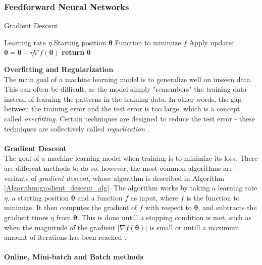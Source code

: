 \documentclass[./main.tex]{subfiles}
\begin{document}
\subsubsection{Feedforward Neural Networks} \label{subsubsec:FeedforwardNN}
\begin{algorithm}[htbp]
    \caption{Gradient Descent \cite{d2l}}
    \label{Algorithm:gradient_descent_alg}
    \begin{algorithmic}[1]
        \Require Learning rate $\eta$
        \Require Starting position $\bm{\theta}$
        \Require Function to minimize $f$
            \State Apply update: $\bm{\theta} = \bm{\theta} - \eta \nabla f(\bm{\theta})$
        \EndWhile
        \State \textbf{return} $\bm{\theta}$
    \end{algorithmic}
\end{algorithm}
\noindent \textbf{Overfitting and Regularization} \\
The main goal of a machine learning model is to generalize well on unseen data. This can often be difficult, as the model simply "remembers" the training data instead of learning the patterns in the training data. In other words, the gap between the training error and the test error is too large, which is a concept called \textit{overfitting}. Certain techniques are designed to reduce the test error - these techniques are collectively called \textit{regurlization} \cite{DeepLearning}. 
\\
\\
\textbf{Gradient Descent} \\
The goal of a machine learning model when training is to minimize its loss. There are different methods to do so, however, the most common algorithms are variants of \textit{gradient descent}, whose algorithm is described in Algorithm \ref{Algorithm:gradient_descent_alg}. The algorithm works by taking a learning rate $\eta$, a starting position $\bm{\theta}$ and a function $f$ as input, where $f$ is the function to minimize. It then computes the gradient of $f$ with respect to $\bm{\theta}$, and subtracts the gradient times $\eta$ from $\bm{\theta}$. This is done untill a stopping condition is met, such as when the magnitude of the gradient $\left| \nabla f(\bm{\theta}) \right|$ is small or untill a maximum amount of iterations has been reached \cite{d2l}.
\\
\\
\noindent \textbf{Online, Mini-batch and Batch methods} \\
\end{document}
